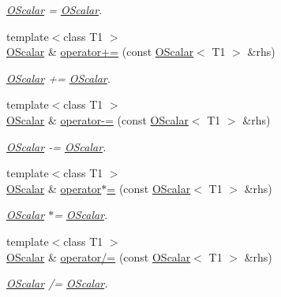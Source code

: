 \begin{DoxyCompactItemize}
\begin{DoxyCompactList}\small\item\em \mbox{\hyperlink{classENSEM_1_1OScalar}{O\+Scalar}} = \mbox{\hyperlink{classENSEM_1_1OScalar}{O\+Scalar}}. \end{DoxyCompactList}\item 
{\footnotesize template$<$class T1 $>$ }\\\mbox{\hyperlink{classENSEM_1_1OScalar}{O\+Scalar}} \& \mbox{\hyperlink{classENSEM_1_1OScalar_a3109a05113cade86410bc77f60812023}{operator+=}} (const \mbox{\hyperlink{classENSEM_1_1OScalar}{O\+Scalar}}$<$ T1 $>$ \&rhs)
\begin{DoxyCompactList}\small\item\em \mbox{\hyperlink{classENSEM_1_1OScalar}{O\+Scalar}} += \mbox{\hyperlink{classENSEM_1_1OScalar}{O\+Scalar}}. \end{DoxyCompactList}\item 
{\footnotesize template$<$class T1 $>$ }\\\mbox{\hyperlink{classENSEM_1_1OScalar}{O\+Scalar}} \& \mbox{\hyperlink{classENSEM_1_1OScalar_a4d240e95768b5a0c9537b32d00d60ac5}{operator-\/=}} (const \mbox{\hyperlink{classENSEM_1_1OScalar}{O\+Scalar}}$<$ T1 $>$ \&rhs)
\begin{DoxyCompactList}\small\item\em \mbox{\hyperlink{classENSEM_1_1OScalar}{O\+Scalar}} -\/= \mbox{\hyperlink{classENSEM_1_1OScalar}{O\+Scalar}}. \end{DoxyCompactList}\item 
{\footnotesize template$<$class T1 $>$ }\\\mbox{\hyperlink{classENSEM_1_1OScalar}{O\+Scalar}} \& \mbox{\hyperlink{classENSEM_1_1OScalar_a9977cd15ef5da689d65713ddf0768085}{operator$\ast$=}} (const \mbox{\hyperlink{classENSEM_1_1OScalar}{O\+Scalar}}$<$ T1 $>$ \&rhs)
\begin{DoxyCompactList}\small\item\em \mbox{\hyperlink{classENSEM_1_1OScalar}{O\+Scalar}} $\ast$= \mbox{\hyperlink{classENSEM_1_1OScalar}{O\+Scalar}}. \end{DoxyCompactList}\item 
{\footnotesize template$<$class T1 $>$ }\\\mbox{\hyperlink{classENSEM_1_1OScalar}{O\+Scalar}} \& \mbox{\hyperlink{classENSEM_1_1OScalar_a1e0517e29754a8acb284c3ac266c2b2c}{operator/=}} (const \mbox{\hyperlink{classENSEM_1_1OScalar}{O\+Scalar}}$<$ T1 $>$ \&rhs)
\begin{DoxyCompactList}\small\item\em \mbox{\hyperlink{classENSEM_1_1OScalar}{O\+Scalar}} /= \mbox{\hyperlink{classENSEM_1_1OScalar}{O\+Scalar}}. \end{DoxyCompactList}\item 

\end{DoxyCompactItemize}
